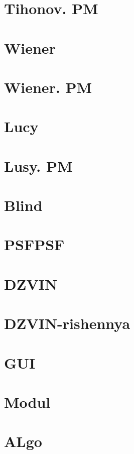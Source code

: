 \documentclass[a5paper,12pt,pdftex]{scrartcl}
\begin{document}
\section{Tihonov. PM }
\vspace*{3cm}
\section{Wiener }
\vspace*{3cm}
\section{Wiener. PM }
\vspace*{3cm}
\section{Lucy }
\vspace*{3cm}
\newpage
\section{Lusy. PM }
\vspace*{3cm}
\section{Blind }
\vspace*{3cm}
\section{PSFPSF }
\vspace*{3cm}
\section{DZVIN }
\vspace*{3cm}
\section{DZVIN-rishennya }
\vspace*{3cm}
\newpage
\section{GUI }
\vspace*{3cm}
\section{Modul }
\vspace*{3cm}
\section{ALgo }
\vspace*{3cm}
\end{document}
